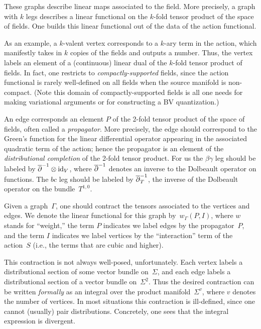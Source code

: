 These graphs describe linear maps associated to the field.
More precisely, a graph with $k$ legs describes a linear functional on the $k$-fold tensor product of the space of fields.
One builds this linear functional out of the data of the action functional.

As an example, a $k$-valent vertex corresponds to a $k$-ary term in the action,
which manifestly takes in $k$ copies of the fields and outputs a number.
Thus, the vertex labels an element of a (continuous) linear dual of the $k$-fold tensor product of fields.
In fact, one restricts to {\em compactly-supported} fields,
since the action functional is rarely well-defined on all fields when the source manifold is non-compact.
(Note this domain of compactly-supported fields is all one needs for making variational arguments or for constructing a BV quantization.)

An edge corresponds an element $P$ of the 2-fold tensor product of the space of fields,
often called a {\em propagator}.
More precisely, the edge should correspond to
the Green's function for the linear differential operator 
appearing in the associated quadratic term of the action;
hence the propagator is an element of the {\em distributional completion} of the 2-fold tensor product.
For us the $\beta\gamma$ leg should be labeled by $\overline{\partial}^{-1} \otimes {\rm id}_V$,
where $\overline{\partial}^{-1}$ denotes an inverse to the Dolbeault operator on functions.
The $bc$ leg should be labeled by $\overline{\partial}^{-1}_T$, 
the inverse of the Dolbeault operator on the bundle~$T^{1,0}$.

Given a graph~$\Gamma$, one should contract the tensors associated to the vertices and edges.
We denote the linear functional for this graph by~$w_\Gamma(P,I)$,
where $w$ stands for ``weight,'' the term $P$ indicates we label edges by the propagator~$P$,
and the term $I$ indicates we label vertices by the ``interaction'' term of the action~$S$ 
(i.e., the terms that are cubic and higher).

This contraction is not always well-posed, unfortunately.
Each vertex labels a distributional section of some vector bundle on~$\Sigma$,
and each edge labels a distributional section of a vector bundle on~$\Sigma^2$.
Thus the desired contraction can be written {\em formally} as an integral over the product manifold~$\Sigma^{v}$,
where $v$ denotes the number of vertices.
In most situations this contraction is ill-defined, 
since one cannot (usually) pair distributions.
Concretely, one sees that the integral expression is divergent.


